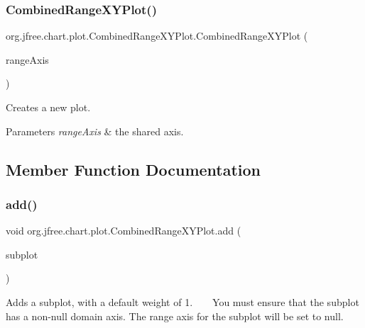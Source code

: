 \subsubsection{\texorpdfstring{Combined\+Range\+X\+Y\+Plot()}{CombinedRangeXYPlot()}\hspace{0.1cm}{\footnotesize\ttfamily [2/2]}}
{\footnotesize\ttfamily org.\+jfree.\+chart.\+plot.\+Combined\+Range\+X\+Y\+Plot.\+Combined\+Range\+X\+Y\+Plot (\begin{DoxyParamCaption}\item[{\mbox{\hyperlink{classorg_1_1jfree_1_1chart_1_1axis_1_1_value_axis}{Value\+Axis}}}]{range\+Axis }\end{DoxyParamCaption})}

Creates a new plot.


\begin{DoxyParams}{Parameters}
{\em range\+Axis} & the shared axis. \\
\hline
\end{DoxyParams}


\subsection{Member Function Documentation}
\mbox{\label{classorg_1_1jfree_1_1chart_1_1plot_1_1_combined_range_x_y_plot_ab7baebaebc18ccd196e6402b651a5bcd}} 
\subsubsection{\texorpdfstring{add()}{add()}\hspace{0.1cm}{\footnotesize\ttfamily [1/2]}}
{\footnotesize\ttfamily void org.\+jfree.\+chart.\+plot.\+Combined\+Range\+X\+Y\+Plot.\+add (\begin{DoxyParamCaption}\item[{\mbox{\hyperlink{classorg_1_1jfree_1_1chart_1_1plot_1_1_x_y_plot}{X\+Y\+Plot}}}]{subplot }\end{DoxyParamCaption})}

Adds a subplot, with a default \textquotesingle{}weight\textquotesingle{} of 1. ~\newline
~\newline
 You must ensure that the subplot has a non-\/null domain axis. The range axis for the subplot will be set to {\ttfamily null}.


